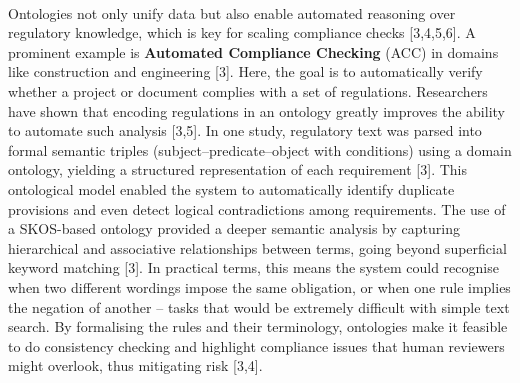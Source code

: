         \paragraph{} Ontologies not only unify data but also enable automated reasoning over regulatory knowledge, which is key for scaling compliance checks [3,4,5,6]. A prominent example is \textbf{Automated Compliance Checking} (ACC) in domains like construction and engineering [3]. Here, the goal is to automatically verify whether a project or document complies with a set of regulations. Researchers have shown that encoding regulations in an ontology greatly improves the ability to automate such analysis [3,5]. In one study, regulatory text was parsed into formal semantic triples (subject–predicate–object with conditions) using a domain ontology, yielding a structured representation of each requirement [3]. This ontological model enabled the system to automatically identify duplicate provisions and even detect logical contradictions among requirements. The use of a SKOS-based ontology provided a deeper semantic analysis by capturing hierarchical and associative relationships between terms, going beyond superficial keyword matching [3]. In practical terms, this means the system could recognise when two different wordings impose the same obligation, or when one rule implies the negation of another – tasks that would be extremely difficult with simple text search. By formalising the rules and their terminology, ontologies make it feasible to do consistency checking and highlight compliance issues that human reviewers might overlook, thus mitigating risk [3,4].

        \newpage
